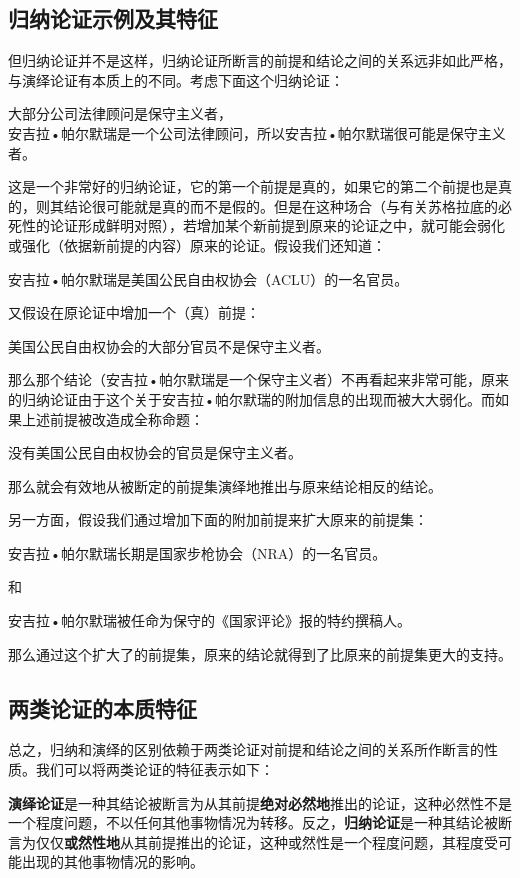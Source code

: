 \subsection{归纳论证示例及其特征}

但归纳论证并不是这样，归纳论证所断言的前提和结论之间的关系远非如此严格，与演绎论证有本质上的不同。考虑下面这个归纳论证：

\begin{displayquote}
大部分公司法律顾问是保守主义者，\\
安吉拉•帕尔默瑞是一个公司法律顾问，所以安吉拉•帕尔默瑞很可能是保守主义者。
\end{displayquote}

这是一个非常好的归纳论证，它的第一个前提是真的，如果它的第二个前提也是真的，则其结论很可能就是真的而不是假的。但是在这种场合（与有关苏格拉底的必死性的论证形成鲜明对照），若增加某个新前提到原来的论证之中，就可能会弱化或强化（依据新前提的内容）原来的论证。假设我们还知道：

安吉拉•帕尔默瑞是美国公民自由权协会（ACLU）的一名官员。

又假设在原论证中增加一个（真）前提：

美国公民自由权协会的大部分官员不是保守主义者。

那么那个结论（安吉拉•帕尔默瑞是一个保守主义者）不再看起来非常可能，原来的归纳论证由于这个关于安吉拉•帕尔默瑞的附加信息的出现而被大大弱化。而如果上述前提被改造成全称命题：

没有美国公民自由权协会的官员是保守主义者。

那么就会有效地从被断定的前提集演绎地推出与原来结论相反的结论。

另一方面，假设我们通过增加下面的附加前提来扩大原来的前提集：

安吉拉•帕尔默瑞长期是国家步枪协会（NRA）的一名官员。

和

安吉拉•帕尔默瑞被任命为保守的《国家评论》报的特约撰稿人。

那么通过这个扩大了的前提集，原来的结论就得到了比原来的前提集更大的支持。

\subsection{两类论证的本质特征}

总之，归纳和演绎的区别依赖于两类论证对前提和结论之间的关系所作断言的性质。我们可以将两类论证的特征表示如下：

\textbf{演绎论证}是一种其结论被断言为从其前提\textbf{绝对必然地}推出的论证，这种必然性不是一个程度问题，不以任何其他事物情况为转移。反之，\textbf{归纳论证}是一种其结论被断言为仅仅\textbf{或然性地}从其前提推出的论证，这种或然性是一个程度问题，其程度受可能出现的其他事物情况的影响。

